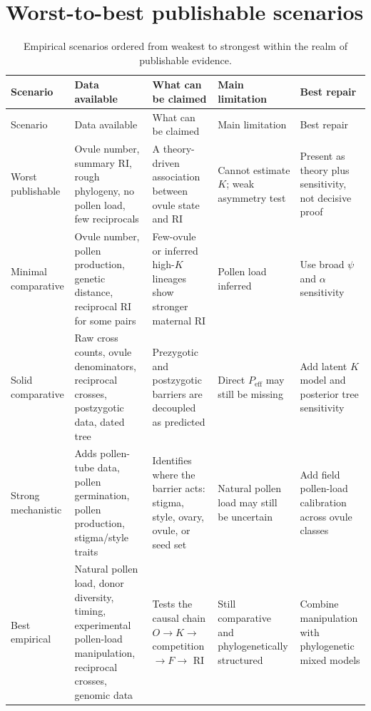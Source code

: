 \documentclass[11pt]{article}
\newcommand{\Peff}{P_{\mathrm{eff}}}
\begin{document}
\section{Worst-to-best publishable scenarios}

\begin{longtable}{>{\raggedright\arraybackslash}p{} >{\raggedright\arraybackslash}p{} >{\raggedright\arraybackslash}p{} >{\raggedright\arraybackslash}p{} >{\raggedright\arraybackslash}p{}}
\caption{Empirical scenarios ordered from weakest to strongest within the realm of publishable evidence.}\\
\toprule
Scenario & Data available & What can be claimed & Main limitation & Best repair \\
\midrule
\endfirsthead
\toprule
Scenario & Data available & What can be claimed & Main limitation & Best repair \\
\midrule
\endhead
Worst publishable & Ovule number, summary RI, rough phylogeny, no pollen load, few reciprocals & A theory-driven association between ovule state and RI & Cannot estimate \(K\); weak asymmetry test & Present as theory plus sensitivity, not decisive proof \\
Minimal comparative & Ovule number, pollen production, genetic distance, reciprocal RI for some pairs & Few-ovule or inferred high-\(K\) lineages show stronger maternal RI & Pollen load inferred & Use broad \(\psi\) and \(\alpha\) sensitivity \\
Solid comparative & Raw cross counts, ovule denominators, reciprocal crosses, postzygotic data, dated tree & Prezygotic and postzygotic barriers are decoupled as predicted & Direct \(\Peff\) may still be missing & Add latent \(K\) model and posterior tree sensitivity \\
Strong mechanistic & Adds pollen-tube data, pollen germination, pollen production, stigma/style traits & Identifies where the barrier acts: stigma, style, ovary, ovule, or seed set & Natural pollen load may still be uncertain & Add field pollen-load calibration across ovule classes \\
Best empirical & Natural pollen load, donor diversity, timing, experimental pollen-load manipulation, reciprocal crosses, genomic data & Tests the causal chain \(O\rightarrow K\rightarrow\) competition \(\rightarrow F\rightarrow\) RI & Still comparative and phylogenetically structured & Combine manipulation with phylogenetic mixed models \\
\bottomrule
\end{longtable}
\end{document}
